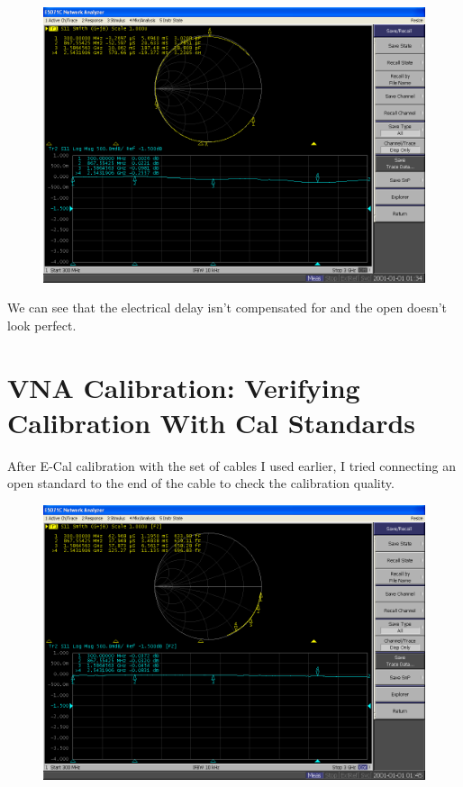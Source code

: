 \documentclass[11pt]{article}
\begin{document}
\begin{figure}[H]
	\centering \includegraphics[width=\linewidth-6cm]{images/S11_OPEN_STD_BEFORE_CAL.PNG}
\end{figure}

We can see that the electrical delay isn't compensated for and the open doesn't look perfect.

\section{VNA Calibration: Verifying Calibration With Cal Standards}
After E-Cal calibration with the set of cables I used earlier, I tried connecting an open standard to the end of the cable to check the calibration quality.

\begin{figure}[H]
	\centering \includegraphics[width=\linewidth-6cm]{images/S11_OPEN_STD_AFTER_CAL.PNG}
\end{figure}
\end{document}
